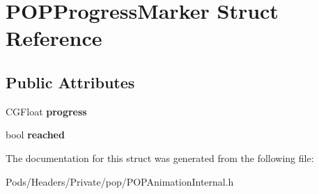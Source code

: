 \hypertarget{struct_p_o_p_progress_marker}{}\section{P\+O\+P\+Progress\+Marker Struct Reference}
\label{struct_p_o_p_progress_marker}
\subsection*{Public Attributes}
\begin{DoxyCompactItemize}
\item 
\mbox{\label{struct_p_o_p_progress_marker_aa3401f0b9b01596dcd51524223c84e66}} 
C\+G\+Float {\bfseries progress}
\item 
\mbox{\label{struct_p_o_p_progress_marker_a0fc5ea7d7b4920053667c0272d66caf4}} 
bool {\bfseries reached}
\end{DoxyCompactItemize}


The documentation for this struct was generated from the following file\+:\begin{DoxyCompactItemize}
\item 
Pods/\+Headers/\+Private/pop/P\+O\+P\+Animation\+Internal.\+h\end{DoxyCompactItemize}
